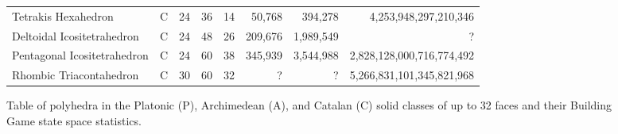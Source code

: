 \documentclass[12pt]{article}
\begin{document}
\begin{figure}[ht]
{\begin{tabular}{ l | c | c | c | c || r | r | r}
Tetrakis Hexahedron             & C & 24 & 36 & 14 	& 50,768        & 394,278       & 4,253,948,297,210,346\\
Deltoidal Icositetrahedron      & C & 24 & 48 & 26 	& 209,676       & 1,989,549     & ? \\
Pentagonal Icositetrahedron     & C & 24 & 60 & 38 	& 345,939       & 3,544,988     & 2,828,128,000,716,774,492\\
Rhombic Triacontahedron         & C & 30 & 60 & 32 	& ?             & ?             & 5,266,831,101,345,821,968\\
  \hline  
\end{tabular}
}
\caption{Table of polyhedra in the Platonic (P), Archimedean (A), and Catalan (C) solid classes of up to 32 faces and their Building Game state space statistics.}
\label{fig:bgtable}
\end{figure}
\end{document}
